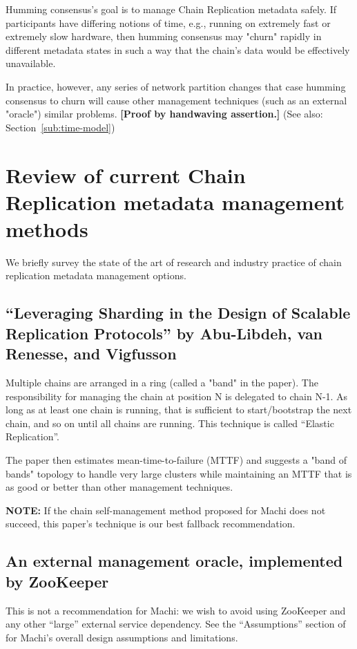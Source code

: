 \documentclass[preprint,10pt]{sigplanconf}
\begin{document}
Humming consensus's goal is to manage Chain Replication metadata
safely.  If participants have differing notions of time, e.g., running
on extremely fast or extremely slow hardware, then humming consensus
may "churn" rapidly in different metadata states in such a way that
the chain's data would be effectively unavailable.  

In practice, however, any series of network partition changes that
case humming consensus to churn will cause other management techniques
(such as an external "oracle") similar problems.
{\bf [Proof by handwaving assertion.]}
(See also: Section~\ref{sub:time-model})

\section{Review of current Chain Replication metadata management methods}
\label{sec:cr-management-review}

We briefly survey the state of the art of research and industry
practice of chain replication metadata management options.

\subsection{``Leveraging Sharding in the Design of Scalable Replication Protocols'' by Abu-Libdeh, van Renesse, and Vigfusson}
\label{ssec:elastic-replication}
Multiple chains are arranged in a ring (called a "band" in the paper).
The responsibility for managing the chain at position N is delegated
to chain N-1.  As long as at least one chain is running, that is
sufficient to start/bootstrap the next chain, and so on until all
chains are running.  This technique is called ``Elastic Replication''.

The paper then estimates mean-time-to-failure
(MTTF) and suggests a "band of bands" topology to handle very large
clusters while maintaining an MTTF that is as good or better than
other management techniques.

{\bf NOTE:} If the chain self-management method proposed for Machi does not
succeed, this paper's technique is our best fallback recommendation.

\subsection{An external management oracle, implemented by ZooKeeper}
\label{ssec:an-oracle}
This is not a recommendation for Machi: we wish to avoid using
ZooKeeper and any other ``large'' external service dependency.  See
the ``Assumptions'' section of \cite{machi-design} for Machi's overall
design assumptions and limitations.
\end{document}
